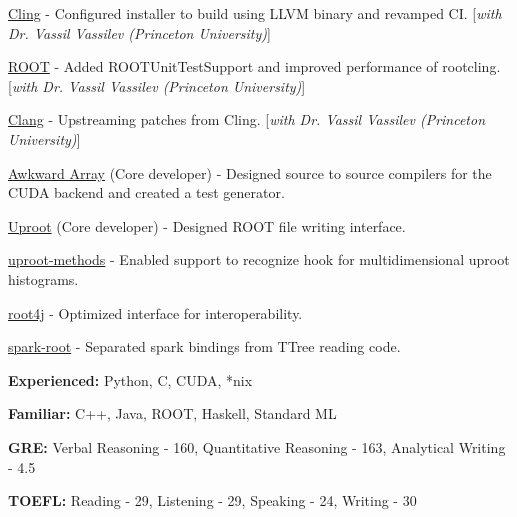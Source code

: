 \documentclass[10pt, letterpaper]{fulldeps}
\begin{document}
\begin{tightitemize}
\item {\href{https://github.com/root-project/cling}{Cling}} - Configured installer to build using LLVM binary and revamped CI. [\textit{with Dr. Vassil Vassilev (Princeton University)}]
\item {\href{https://github.com/root-project/root}{ROOT}} - Added ROOTUnitTestSupport and improved performance of rootcling. [\textit{with Dr. Vassil Vassilev (Princeton University)}]
\item {\href{https://clang.llvm.org/}{Clang}} - Upstreaming patches from Cling. [\textit{with Dr. Vassil Vassilev (Princeton University)}]
\item {\href{https://github.com/scikit-hep/awkward-1.0}{Awkward Array}} (Core developer) - Designed source to source compilers for the CUDA backend and created a test generator.
\item {\href{https://github.com/scikit-hep/uproot}{Uproot}} (Core developer) - Designed ROOT file writing interface.
\item {\href{https://github.com/scikit-hep/uproot-methods}{uproot-methods}} - Enabled support to recognize hook for multidimensional uproot histograms.
\item {\href{https://github.com/diana-hep/root4j}{root4j}} - Optimized interface for interoperability.
\item {\href{https://github.com/diana-hep/spark-root}{spark-root}} - Separated spark bindings from TTree reading code.
\end{tightitemize}

%
%
\vspace{-2pt}
\textbf{Experienced:} Python, C, CUDA, *nix

\textbf{Familiar:} C++, Java, ROOT, Haskell,  Standard ML
\vspace{-6pt}

\begin{tightitemize}
\item \textbf{GRE:} Verbal Reasoning - 160, Quantitative Reasoning - 163, Analytical Writing - 4.5
\item \textbf{TOEFL:} Reading - 29, Listening - 29, Speaking - 24, Writing - 30
\end{tightitemize}
\end{document}
